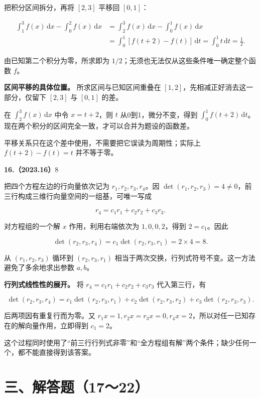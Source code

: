 \documentclass[UTF8,11pt,fontset=windows]{ctexart}
\begin{document}
把积分区间拆分，再将 $[2,3]$ 平移回 $[0,1]$：

$$
\begin{aligned}
\int_1^3 f(x)\,\mathrm dx-\int_0^2 f(x)\,\mathrm dx
&=\int_2^3 f(x)\,\mathrm dx-\int_0^1 f(x)\,\mathrm dx\\
&=\int_0^1[f(t+2)-f(t)]\,\mathrm dt
=\int_0^1t\,\mathrm dt=\frac12.
\end{aligned}
$$

由已知第二个积分为零，所求即为 $1/2$；无须也无法仅从这些条件唯一确定整个函数 $f$。

\textbf{区间平移的具体位置。} 所求区间与已知区间重叠在 $[1,2]$，先相减正好消去这一部分，仅留下 $[2,3]$ 与 $[0,1]$ 的差。

在 $\int_2^3f(x)\,\mathrm dx$ 中令 $x=t+2$，则 $t$ 从0到1，微分不变，得到 $\int_0^1f(t+2)\,\mathrm dt$。现在两个积分的区间完全一致，才可以合并为题设的函数差。

平移关系只在这个差中使用，不需要把它误读为周期性；实际上 $f(t+2)-f(t)=t$ 并不等于零。

\clearpage

\textbf{16.（2023.16）$8$}

把四个方程左边的行向量依次记为 $r_1,r_2,r_3,r_4$。因 $\det(r_1,r_2,r_3)=4\ne0$，前三行构成三维行向量空间的一组基，可唯一写成

$$
r_4=c_1r_1+c_2r_2+c_3r_3.
$$

对方程组的一个解 $x$ 作用，利用右端依次为 $1,0,0,2$，得到 $2=c_1$。因此

$$
\det(r_2,r_3,r_4)=c_1\det(r_2,r_3,r_1)=2\times4=8.
$$

从 $(r_1,r_2,r_3)$ 循环到 $(r_2,r_3,r_1)$ 相当于两次交换，行列式符号不变。这一方法避免了多余地求出参数 $a,b$。

\textbf{行列式线性性的展开。} 将 $r_4=c_1r_1+c_2r_2+c_3r_3$ 代入第三行，有

$$
\det(r_2,r_3,r_4)
=c_1\det(r_2,r_3,r_1)
+c_2\det(r_2,r_3,r_2)
+c_3\det(r_2,r_3,r_3).
$$

后两项因有重复行而为零。又 $r_1x=1,r_2x=r_3x=0,r_4x=2$，所以对任一已知存在的解向量作用，立即得到 $c_1=2$。

这个过程同时使用了“前三行行列式非零”和“全方程组有解”两个条件；缺少任何一个，都不能直接得到该答案。

\clearpage

\section*{三、解答题（17～22）}
\end{document}
